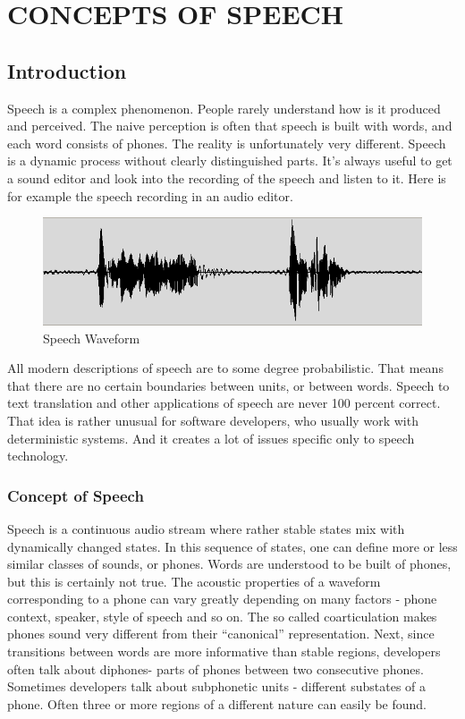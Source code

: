 \documentclass[12pt,a4paper,oldfontcommands]{memoir}
\begin{document}






\chapter{ CONCEPTS OF SPEECH}

\section{Introduction}
Speech is a complex phenomenon. People rarely understand how is it produced and perceived. The naive perception is often that speech is built with words, and each word consists of phones. The reality is unfortunately very different. Speech is a dynamic process without clearly distinguished parts. It's always useful to get a sound editor and look into the recording of the speech and listen to it. Here is for example the speech recording in an audio editor.

\begin{figure}[h]
    \centering
    \includegraphics[scale=0.5]{waveform}
    \caption{Speech Waveform}
\end{figure}

All modern descriptions of speech are to some degree probabilistic. That means that there are no certain boundaries between units, or between words. Speech to text translation and other applications of speech are never 100 percent correct. That idea is rather unusual for software developers, who usually work with deterministic systems. And it creates a lot of issues specific only to speech technology. 


\subsection{Concept of Speech}
Speech is a continuous audio stream where rather stable states mix with dynamically changed states. In this sequence of states, one can define more or less similar classes of sounds, or phones. Words are understood to be built of phones, but this is certainly not true. The acoustic properties of a waveform corresponding to a phone can vary greatly depending on many factors - phone context, speaker, style of speech and so on. The so called coarticulation makes phones sound very different from their “canonical” representation. Next, since transitions between words are more informative than stable regions, developers often talk about diphones- parts of phones between two consecutive phones. Sometimes developers talk about subphonetic units - different substates of a phone. Often three or more regions of a different nature can easily be found.
\end{document}

